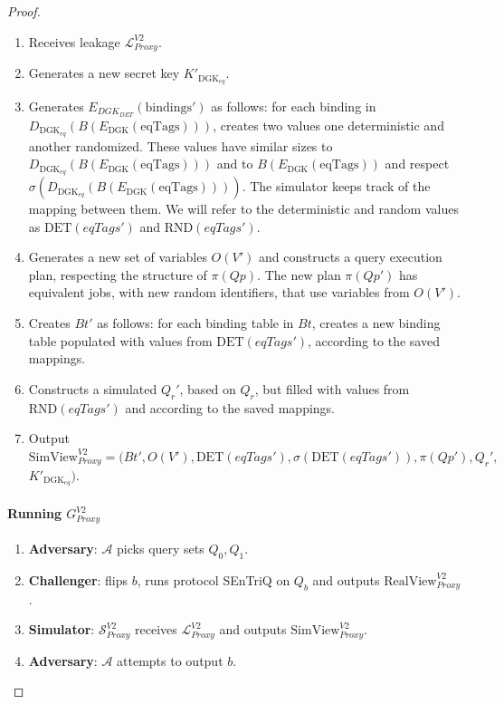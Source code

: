 \begin{proof}
    \begin{enumerate}
        \item Receives leakage $\mathcal{L}_{Proxy}^{V2}$.
        \item Generates a new secret key $K'_{\text{DGK}_{eq}}$.
        \item Generates $E_{DGK_{DET}}(\mathrm{bindings'})$ as follows: for each binding in \linebreak $D_{\text{DGK}_{eq}}(B(E_{\text{DGK}}(\mathrm{eqTags})))$, creates two values one deterministic and another randomized. These values have similar sizes to $D_{\text{DGK}_{eq}}(B(E_{\text{DGK}}(\mathrm{eqTags})))$ and to \linebreak $B(E_{\text{DGK}}(\mathrm{eqTags}))$ and respect $\sigma(D_{\text{DGK}_{eq}}(B(E_{\text{DGK}}(\mathrm{eqTags}))))$. The simulator keeps track of the mapping between them. We will refer to the deterministic and random values as $\text{DET}(eqTags')$ and $\text{RND}(eqTags')$.
        \item Generates a new set of variables $O(V')$ and constructs a query execution plan, respecting the structure of $\pi(Qp)$. The new plan $\pi(Qp')$ has equivalent jobs, with new random identifiers, that use variables from $O(V')$.
        \item Creates $Bt'$ as follows: for each binding table in $Bt$, creates a new binding table populated with values from $\text{DET}(eqTags')$, according to the saved mappings.
        \item Constructs a simulated $Q_r'$, based on $Q_r$, but filled with values from $\text{RND}(eqTags')$ and according to the saved mappings.
        \item Output $\mathrm{SimView}_{Proxy}^{V2} = (Bt', O(V'), \text{DET}(eqTags'), \sigma(\text{DET}(eqTags')), \pi(Qp'), Q_r',$ \linebreak $K'_{\text{DGK}_{eq}})$.
    \end{enumerate}

    \paragraph{Running $G^{V2}_{Proxy}$}

    \begin{enumerate}
        \item \textbf{Adversary}: $\mathcal{A}$ picks query sets $Q_0, Q_1$.
        \item \textbf{Challenger}: flips $b$, runs protocol \gls{SEnTriQ} on $Q_b$ and outputs \linebreak$\mathrm{RealView}^{V2}_{Proxy}$.
        \item \textbf{Simulator}: $\mathcal{S}_{Proxy}^{V2}$ receives $\mathcal{L}_{Proxy}^{V2}$ and outputs $\mathrm{SimView}_{Proxy}^{V2}$.
        \item \textbf{Adversary}: $\mathcal{A}$ attempts to output $b$. 
    \end{enumerate}


\end{proof}

